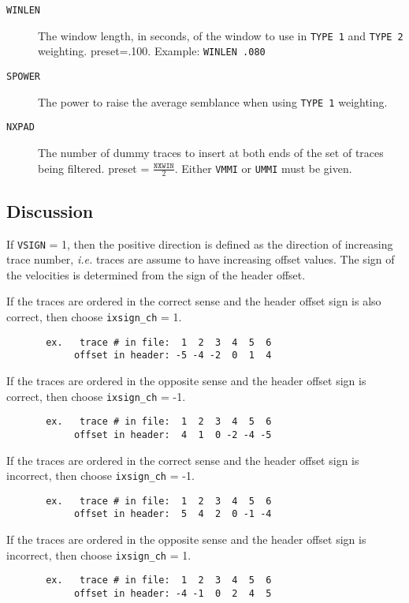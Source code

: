 \begin{description}
\item[\texttt{WINLEN}] The window length, in seconds, of the window to use in \texttt{TYPE 1} and \texttt{TYPE 2} weighting.  \Gls{preset}=.100.  Example: \texttt{WINLEN .080}

\item[\texttt{SPOWER}] The power to raise the average semblance when using \texttt{TYPE 1} weighting.

\item[\texttt{NXPAD}]  The number of dummy traces to insert at both ends of the set of traces being filtered.  \Gls{preset} = $\frac{\texttt{NXWIN}}{2}$.  Either \texttt{VMMI} or \texttt{UMMI} must be given.
\end{description}

\subsection{Discussion}
     If \texttt{VSIGN} = 1, then the positive direction is defined as the direction
     of increasing trace number, \textit{i.e.} traces are assume to have increasing
     offset values.  The sign of the velocities is determined from the
     sign of the header offset.

      If the traces are ordered in the correct  sense and the header
       offset sign is also correct, then choose \texttt{ixsign\_ch} = 1.
\begin{verbatim}
       ex.   trace # in file:  1  2  3  4  5  6
            offset in header: -5 -4 -2  0  1  4
\end{verbatim}

      If the traces are ordered in the opposite sense and the header
       offset sign is correct, then choose \texttt{ixsign\_ch} = -1.
\begin{verbatim}
       ex.   trace # in file:  1  2  3  4  5  6
            offset in header:  4  1  0 -2 -4 -5
\end{verbatim}

      If the traces are ordered in the correct sense and the header
       offset sign is incorrect, then choose \texttt{ixsign\_ch} = -1.
\begin{verbatim}
       ex.   trace # in file:  1  2  3  4  5  6
            offset in header:  5  4  2  0 -1 -4
\end{verbatim}

      If the traces are ordered in the opposite sense and the header
       offset sign is incorrect, then choose \texttt{ixsign\_ch} = 1.
\begin{verbatim}
       ex.   trace # in file:  1  2  3  4  5  6
            offset in header: -4 -1  0  2  4  5
\end{verbatim}

